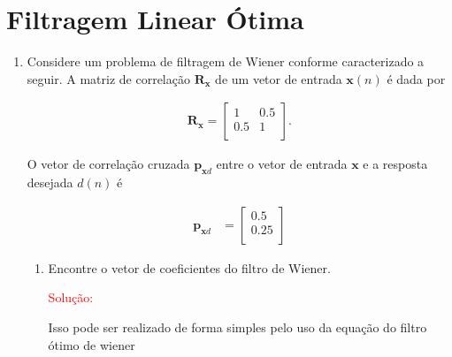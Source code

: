 \documentclass[a4paper,10pt]{article}
\begin{document}
	\newpage
	\section*{Filtragem Linear Ótima}
	
		\begin{enumerate}
			
			\item Considere um problema de filtragem de Wiener conforme caracterizado a seguir. A matriz de correlação $\mathbf{R}_{\mathbf{x}}$ de um vetor de entrada $\mathbf{x}(n)$ é dada por
			
				\begin{align*}
					\mathbf{R}_{\mathbf{x}} = \left[ \begin{matrix}
						1 & {0.5}  \\   {0.5} & 1  \\ \end{matrix} \right].
				\end{align*}
				
				O vetor de correlação cruzada $\mathbf{p}_{\mathbf{x}d}$ entre o vetor de entrada $\mathbf{x}$ e a resposta desejada
				$d(n)$ é
				
				\begin{align*}
					\mathbf{p}_{\mathbf{x}d} &= \left[ \begin{matrix}   {0.5}  \\   {0.25}  \\ \end{matrix} \right]
				\end{align*}
				
				\begin{enumerate}
					
					\item Encontre o vetor de coeficientes do filtro de Wiener.
					
						\textcolor{red}{Solução:}
						
						Isso pode ser realizado de forma simples pelo uso da equação do filtro ótimo de wiener
						

\end{enumerate}
\end{enumerate}
\end{document}
